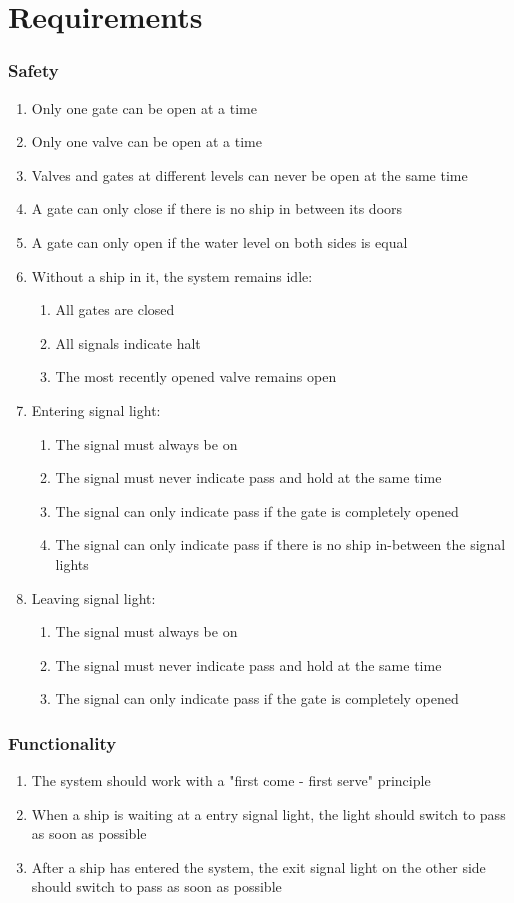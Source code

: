 \section{Requirements}
\subsubsection*{Safety}
\begin{enumerate}
	\item Only one gate can be open at a time
	\item Only one valve can be open at a time
	\item Valves and gates at different levels can never be open at the same time	
	\item A gate can only close if there is no ship in between its doors
	\item A gate can only open if the water level on both sides is equal
	\item Without a ship in it, the system remains idle:
	\begin{enumerate}
		\item All gates are closed
		\item All signals indicate halt
		\item The most recently opened valve remains open
	\end{enumerate}
	\item Entering signal light:
	\begin{enumerate}
		\item The signal must always be on
		\item The signal must never indicate pass and hold at the same time
		\item The signal can only indicate pass if the gate is completely opened
		\item The signal can only indicate pass if there is no ship in-between the signal lights
	\end{enumerate}
	\item Leaving signal light:
	\begin{enumerate}
		\item The signal must always be on
		\item The signal must never indicate pass and hold at the same time
		\item The signal can only indicate pass if the gate is completely opened
	\end{enumerate}
\end{enumerate}
	
\subsubsection*{Functionality}
\begin{enumerate}
	\item The system should work with a "first come - first serve" principle
	\item When a ship is waiting at a entry signal light, the light should switch to pass as soon as possible
	\item After a ship has entered the system, the exit signal light on the other side should switch to pass as soon as possible
\end{enumerate}

